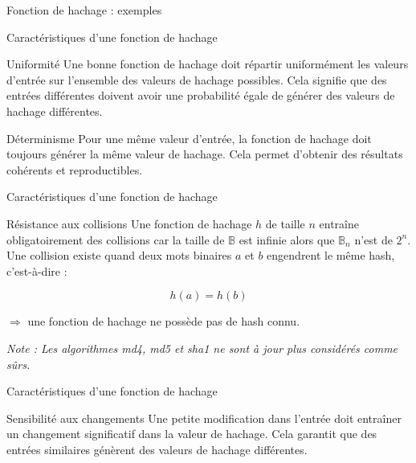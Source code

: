 \begin{frame}[fragile]{Fonction de hachage : exemples}
  
  
\end{frame}

\begin{frame}{Caractéristiques d'une fonction de hachage}
  \begin{block}{Uniformité}
    Une bonne fonction de hachage doit répartir uniformément les valeurs d'entrée sur l'ensemble des valeurs de hachage possibles. Cela signifie que des entrées différentes doivent avoir une probabilité égale de générer des valeurs de hachage différentes.
  \end{block}

  \begin{block}{Déterminisme}
    Pour une même valeur d'entrée, la fonction de hachage doit toujours générer la même valeur de hachage. Cela permet d'obtenir des résultats cohérents et reproductibles.


  \end{block}
\end{frame}

\begin{frame}{Caractéristiques d'une fonction de hachage}
  \begin{block}{Résistance aux collisions}
    Une fonction de hachage $h$ de taille $n$ entraîne obligatoirement des collisions car la taille de $\mathbb{B}$ est infinie alors que $\mathbb{B}_n$ n'est  de $2^n$.
    Une collision existe quand deux mots binaires $a$ et $b$ engendrent le même hash, c'est-à-dire :

    $$h(a) = h(b)$$

    $\Rightarrow$ une  fonction de hachage ne possède pas de hash connu.

    \begin{small}
      \textit{Note : Les algorithmes md4, md5 et sha1 ne sont à jour plus considérés comme sûrs.}
    \end{small}
  \end{block}
\end{frame}

\begin{frame}{Caractéristiques d'une fonction de hachage}
  \begin{block}{Sensibilité aux changements}
    Une petite modification dans l'entrée doit entraîner un changement significatif dans la valeur de hachage.
    Cela garantit que des entrées similaires génèrent des valeurs de hachage différentes.
  \end{block}

  
\end{frame}

